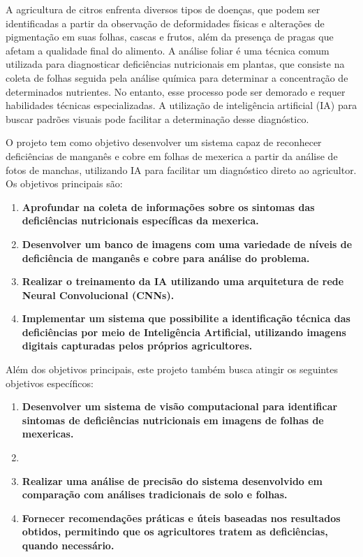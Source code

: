A agricultura de citros enfrenta diversos tipos de doenças, que podem ser identificadas a partir da observação de deformidades físicas e alterações de pigmentação em suas folhas, cascas e frutos, além da presença de pragas que afetam a qualidade final do alimento. A análise foliar é uma técnica comum utilizada para diagnosticar deficiências nutricionais em plantas, que consiste na coleta de folhas seguida pela análise química para determinar a concentração de determinados nutrientes. No entanto, esse processo pode ser demorado e requer habilidades técnicas especializadas. A utilização de inteligência artificial (IA) para buscar padrões visuais pode facilitar a determinação desse diagnóstico.

O projeto tem como objetivo desenvolver um sistema capaz de reconhecer deficiências de manganês e cobre em folhas de mexerica a partir da análise de fotos de manchas, utilizando IA para facilitar um diagnóstico direto ao agricultor. Os objetivos principais são:
\begin{enumerate} 
\item \textbf{Aprofundar na coleta de informações sobre os sintomas das deficiências nutricionais específicas da mexerica.} 
\item \textbf{Desenvolver um banco de imagens com uma variedade de níveis de deficiência de manganês e cobre para análise do problema.} \item \textbf{Realizar o treinamento da IA utilizando uma arquitetura de rede Neural Convolucional (CNNs).} 
\item \textbf{Implementar um sistema que possibilite a identificação técnica das deficiências por meio de Inteligência Artificial, utilizando imagens digitais capturadas pelos próprios agricultores.} 
\end{enumerate}

Além dos objetivos principais, este projeto também busca atingir os seguintes objetivos específicos:

\begin{enumerate} 
\item \textbf{Desenvolver um sistema de visão computacional para identificar sintomas de deficiências nutricionais em imagens de folhas de mexericas.}
\item \textbf{} 
\item \textbf{Realizar uma análise de precisão do sistema desenvolvido em comparação com análises tradicionais de solo e folhas.} 
\item \textbf{Fornecer recomendações práticas e úteis baseadas nos resultados obtidos, permitindo que os agricultores tratem as deficiências, quando necessário.} \end{enumerate}

